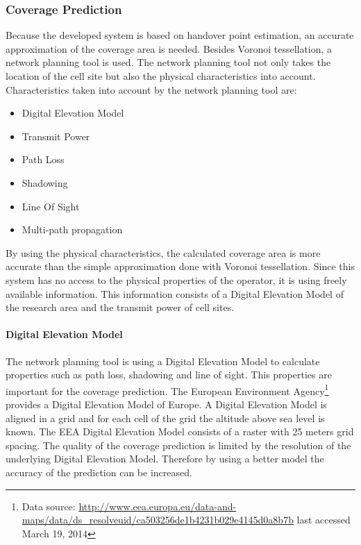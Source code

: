\documentclass[master,english]{hgbthesis}
\begin{document}
\subsubsection{Coverage Prediction}
Because the developed system is based on handover point estimation, an accurate approximation of the coverage area is needed. Besides Voronoi tessellation, a network planning tool is used. The network planning tool not only takes the location of the cell site but also the physical characteristics into account. Characteristics taken into account by the network planning tool are:
\begin{itemize}
	\item Digital Elevation Model
	\item Transmit Power
	\item Path Loss
	\item Shadowing
	\item Line Of Sight
	\item Multi-path propagation
\end{itemize}
By using the physical characteristics, the calculated coverage area is more accurate than the simple approximation done with Voronoi tessellation. Since this system has no access to the physical properties of the operator, it is using freely available information. This information consists of a Digital Elevation Model of the research area and the transmit power of cell sites.
\paragraph{Digital Elevation Model}
The network planning tool is using a Digital Elevation Model to calculate properties such as path loss, shadowing and line of sight. This properties are important for the coverage prediction. The European Environment Agency\footnote{Data source: \url{http://www.eea.europa.eu/data-and-maps/data/ds_resolveuid/ca503256de1b4231b029e4145d0a8b7b} last accessed March 19, 2014} provides a Digital Elevation Model of Europe. A Digital Elevation Model is aligned in a grid and for each cell of the grid the altitude above sea level is known. The EEA Digital Elevation Model consists of a raster with 25 meters grid spacing. The quality of the coverage prediction is limited by the resolution of the underlying Digital Elevation Model. Therefore by using a better model the accuracy of the prediction can be increased.
\end{document}
